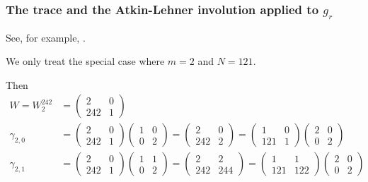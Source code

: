 \documentclass{article}
\begin{document}
 \subsubsection{The trace and the Atkin-Lehner involution applied to
   $g_r$}

See, for example, \cite{Kohnen:WeierstrassPointsAtInfinity:2004}.

We only treat the special case where $m=2$ and $N=121$.

Then
\begin{align*}
  W = W_2^{242}
  &=
    \begin{pmatrix}
      2 & 0\\
      242 & 1
    \end{pmatrix}\\
  \gamma_{2,0}
  &=
    \begin{pmatrix}
      2 & 0\\
      242 & 1
    \end{pmatrix}
    \begin{pmatrix}
      1 & 0\\
      0 & 2
    \end{pmatrix}
  =
    \begin{pmatrix}2&0\\242&2\end{pmatrix}
  =
    \begin{pmatrix}1&0\\121&1\end{pmatrix}
    \begin{pmatrix}2&0\\0&2\end{pmatrix}
  \\
  \gamma_{2,1}
  &=
    \begin{pmatrix}
      2 & 0\\
      242 & 1
    \end{pmatrix}
    \begin{pmatrix}
      1 & 1\\
      0 & 2
    \end{pmatrix}
  =
    \begin{pmatrix}2&2\\242&244\end{pmatrix}
  =
    \begin{pmatrix}1&1\\121&122\end{pmatrix}
    \begin{pmatrix}2&0\\0&2\end{pmatrix}
\end{align*}
\end{document}
